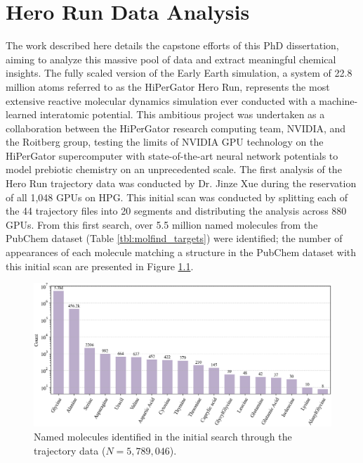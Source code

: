 \chapter{Hero Run Data Analysis} 
\label{chapter5}

The work described here details the capstone efforts of this PhD dissertation, aiming to analyze this massive pool of data and extract meaningful chemical insights.
The fully scaled version of the Early Earth simulation, a system of 22.8 million atoms referred to as the HiPerGator Hero Run, represents the most extensive reactive molecular dynamics simulation ever conducted with a machine-learned interatomic potential.
This ambitious project was undertaken as a collaboration between the HiPerGator research computing team, NVIDIA, and the Roitberg group, testing the limits of NVIDIA GPU technology on the HiPerGator supercomputer with state-of-the-art neural network potentials to model prebiotic chemistry on an unprecedented scale.
The first analysis of the Hero Run trajectory data was conducted by Dr. Jinze Xue during the reservation of all 1,048 GPUs on HPG.
This initial scan was conducted by splitting each of the 44 trajectory files into 20 segments and distributing the analysis across 880 GPUs.
From this first search, over 5.5 million named molecules from the PubChem dataset (Table \ref{tbl:molfind_targets}) were identified; the number of appearances of each molecule matching a structure in the PubChem dataset with this initial scan are presented in Figure \ref{fig:initial_scan}.

\begin{figure}[!h]
    \centering
    \includegraphics[width=1\linewidth]{Images/early_earth/updated_original_counts.png}
    \caption[Molecules identified in the initial search]{Named molecules identified in the initial search through the trajectory data ($N=5,789,046$). }
    \label{fig:initial_scan}
\end{figure}

